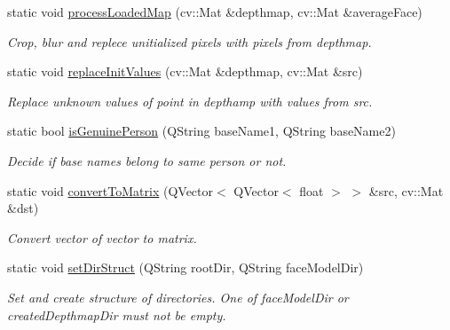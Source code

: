 \begin{DoxyCompactItemize}
static void \hyperlink{class_common_a727cc9c60725b5046f391aba449f1a9f}{process\+Loaded\+Map} (cv\+::\+Mat \&depthmap, cv\+::\+Mat \&average\+Face)
\begin{DoxyCompactList}\small\item\em Crop, blur and replece unitialized pixels with pixels from depthmap. \end{DoxyCompactList}\item 
static void \hyperlink{class_common_ac71621f469fc1407b59c1ffcaf81effd}{replace\+Init\+Values} (cv\+::\+Mat \&depthmap, cv\+::\+Mat \&src)
\begin{DoxyCompactList}\small\item\em Replace unknown values of point in depthamp with values from src. \end{DoxyCompactList}\item 
static bool \hyperlink{class_common_af615d006ad3fb214dc4112dfe0a02e91}{is\+Genuine\+Person} (Q\+String base\+Name1, Q\+String base\+Name2)
\begin{DoxyCompactList}\small\item\em Decide if base names belong to same person or not. \end{DoxyCompactList}\item 
static void \hyperlink{class_common_a6c2e62255d1d745c880d42c49e5b80e5}{convert\+To\+Matrix} (Q\+Vector$<$ Q\+Vector$<$ float $>$ $>$ \&src, cv\+::\+Mat \&dst)
\begin{DoxyCompactList}\small\item\em Convert vector of vector to matrix. \end{DoxyCompactList}\item 
static void \hyperlink{class_common_a3379a84b4d4cd4e9706d5e21ff678742}{set\+Dir\+Struct} (Q\+String root\+Dir, Q\+String face\+Model\+Dir)
\begin{DoxyCompactList}\small\item\em Set and create structure of directories. One of face\+Model\+Dir or created\+Depthmap\+Dir must not be empty. \end{DoxyCompactList}\end{DoxyCompactItemize}
